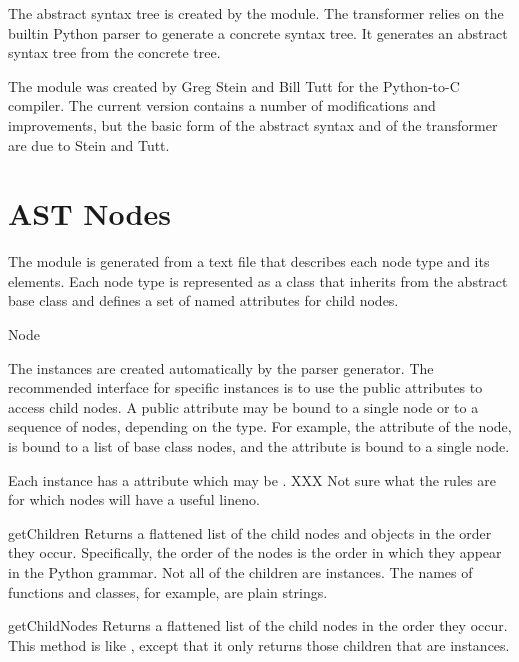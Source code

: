 \documentclass{manual}
\begin{document}
The abstract syntax tree is created by the
 module.  The transformer relies on the
builtin Python parser to generate a concrete syntax tree.  It
generates an abstract syntax tree from the concrete tree.  

The  module was created by Greg Stein and Bill
Tutt for the Python-to-C compiler.  The current version contains a
number of modifications and improvements, but the basic form of the
abstract syntax and of the transformer are due to Stein and Tutt.

\section{AST Nodes}

The  module is generated from a text file that describes
each node type and its elements.  Each node type is represented as a
class that inherits from the abstract base class  and
defines a set of named attributes for child nodes.

\begin{classdesc}{Node}{}
  
  The  instances are created automatically by the parser
  generator.  The recommended interface for specific 
  instances is to use the public attributes to access child nodes.  A
  public attribute may be bound to a single node or to a sequence of
  nodes, depending on the  type.  For example, the
   attribute of the  node, is bound to a
  list of base class nodes, and the  attribute is bound to
  a single node.
  
  Each  instance has a  attribute which may
  be .  XXX Not sure what the rules are for which nodes
  will have a useful lineno.

  \begin{methoddesc}{getChildren}{}
    Returns a flattened list of the child nodes and objects in the
    order they occur.  Specifically, the order of the nodes is the
    order in which they appear in the Python grammar.  Not all of the
    children are  instances.  The names of functions and
    classes, for example, are plain strings.
  \end{methoddesc}

  \begin{methoddesc}{getChildNodes}{}
    Returns a flattened list of the child nodes in the order they
    occur.  This method is like , except that it
    only returns those children that are  instances.
  \end{methoddesc}

\end{classdesc}
\end{document}
